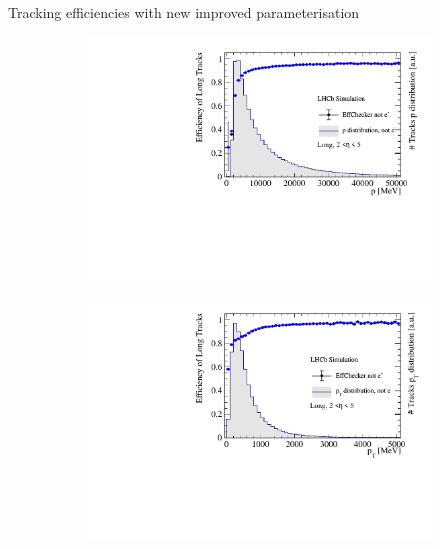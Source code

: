 \documentclass[xcolor={dvipsnames}]{beamer}
\begin{document}
\begin{frame}{Tracking efficiencies with new improved parameterisation}
  \vspace{0.0cm}
  \begin{figure}[htb]
    \centering
    \begin{subfigure}{0.45\textwidth}
      \includegraphics[width=1\textwidth]{Plots/TrackEfficiency_p_improved_MC_parameterisation.pdf}
    \end{subfigure}%
    \begin{subfigure}{0.45\textwidth}
      \includegraphics[width=1\textwidth]{Plots/TrackEfficiency_pt_improved_MC_parameterisation.pdf}
    \end{subfigure}
    \begin{subfigure}{0.45\textwidth}

\end{subfigure}
\end{figure}
\end{frame}
\end{document}
